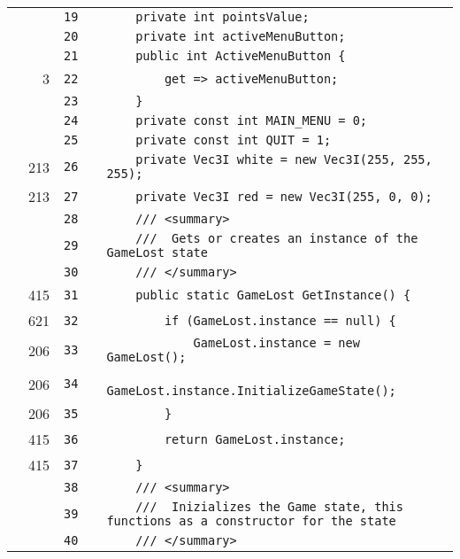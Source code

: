 \documentclass[a4paper,landscape,10pt]{article}
\begin{document}
\begin{longtable}[l]{lrrll}
\cellcolor{gray} &  & \verb~19~ & & \verb~    private int pointsValue;~\\
\cellcolor{gray} &  & \verb~20~ & & \verb~    private int activeMenuButton;~\\
\cellcolor{gray} &  & \verb~21~ & & \verb~    public int ActiveMenuButton {~\\
\cellcolor{green} & 3 & \verb~22~ & & \verb~        get => activeMenuButton;~\\
\cellcolor{gray} &  & \verb~23~ & & \verb~    }~\\
\cellcolor{gray} &  & \verb~24~ & & \verb~    private const int MAIN_MENU = 0;~\\
\cellcolor{gray} &  & \verb~25~ & & \verb~    private const int QUIT = 1;~\\
\cellcolor{green} & 213 & \verb~26~ & & \verb~    private Vec3I white = new Vec3I(255, 255, 255);~\\
\cellcolor{green} & 213 & \verb~27~ & & \verb~    private Vec3I red = new Vec3I(255, 0, 0);~\\
\cellcolor{gray} &  & \verb~28~ & & \verb~    /// <summary>~\\
\cellcolor{gray} &  & \verb~29~ & & \verb~    ///  Gets or creates an instance of the GameLost state~\\
\cellcolor{gray} &  & \verb~30~ & & \verb~    /// </summary>~\\
\cellcolor{green} & 415 & \verb~31~ & & \verb~    public static GameLost GetInstance() {~\\
\cellcolor{green} & 621 & \verb~32~ & & \verb~        if (GameLost.instance == null) {~\\
\cellcolor{green} & 206 & \verb~33~ & & \verb~            GameLost.instance = new GameLost();~\\
\cellcolor{green} & 206 & \verb~34~ & & \verb~            GameLost.instance.InitializeGameState();~\\
\cellcolor{green} & 206 & \verb~35~ & & \verb~        }~\\
\cellcolor{green} & 415 & \verb~36~ & & \verb~        return GameLost.instance;~\\
\cellcolor{green} & 415 & \verb~37~ & & \verb~    }~\\
\cellcolor{gray} &  & \verb~38~ & & \verb~    /// <summary>~\\
\cellcolor{gray} &  & \verb~39~ & & \verb~    ///  Inizializes the Game state, this functions as a constructor for the state~\\
\cellcolor{gray} &  & \verb~40~ & & \verb~    /// </summary>~\\

\end{longtable}
\end{document}

